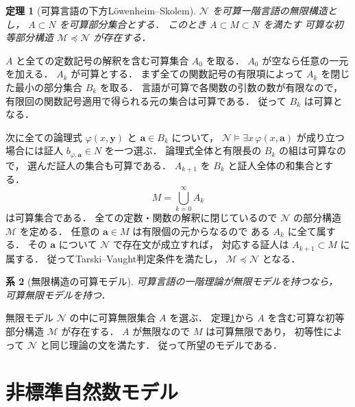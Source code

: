 \documentclass[a5paper,10pt,onecolumn]{jsarticle}
\makeatletter
\theoremstyle{mathnotetheorem}
\newtheorem{theorem}{定理}[section]
\newtheorem{corollary}[theorem]{系}
\renewcommand{\proofname}{証明}
\renewenvironment{proof}[1][\proofname]{%
  \par\pushQED{\qed}\normalfont\topsep4\p@\@plus2\p@\relax
  \trivlist\item[\hskip\labelsep\bfseries #1]\ignorespaces
}{\popQED\endtrivlist\@endpefalse}
\makeatother
\begin{document}
\begin{theorem}[可算言語の下方L\"owenheim--Skolem]
\label{thm:ls}
$\mathcal N$ を可算一階言語の無限構造とし，
$A\subset N$ を可算部分集合とする．
このとき $A\subset M\subset N$ を満たす
可算な初等部分構造 $\mathcal M\preccurlyeq\mathcal N$
が存在する．
\end{theorem}
\begin{proof}
$A$ と全ての定数記号の解釈を含む可算集合 $A_0$ を取る．
$A_0$ が空なら任意の一元を加える．
$A_k$ が可算とする．
まず全ての関数記号の有限項によって
$A_k$ を閉じた最小の部分集合 $B_k$ を取る．
言語が可算で各関数の引数の数が有限なので，
有限回の関数記号適用で得られる元の集合は可算である．
従って $B_k$ は可算となる．

次に全ての論理式 $\varphi(x,\boldsymbol y)$ と
$\boldsymbol a\in B_k$ について，
$\mathcal N\models\exists x\,\varphi(x,\boldsymbol a)$
が成り立つ場合には証人 $b_{\varphi,\boldsymbol a}\in N$
を一つ選ぶ．
論理式全体と有限長の $B_k$ の組は可算なので，
選んだ証人の集合も可算である．
$A_{k+1}$ を $B_k$ と証人全体の和集合とする．
\[
 M=\bigcup_{k=0}^\infty A_k
\]
は可算集合である．
全ての定数・関数の解釈に閉じているので
$\mathcal N$ の部分構造 $\mathcal M$ を定める．
任意の $\boldsymbol a\in M$ は有限個の元からなるので
ある $A_k$ に全て属する．
その $\boldsymbol a$ について
$\mathcal N$ で存在文が成立すれば，
対応する証人は $A_{k+1}\subset M$ に属する．
従ってTarski--Vaught判定条件を満たし，
$\mathcal M\preccurlyeq\mathcal N$ となる．
\end{proof}

\begin{corollary}[無限構造の可算モデル]\label{cor:countable-model}
可算言語の一階理論が無限モデルを持つなら，
可算無限モデルを持つ．
\end{corollary}
\begin{proof}
無限モデル $\mathcal N$ の中に可算無限集合 $A$ を選ぶ．
定理\ref{thm:ls}から $A$ を含む可算な初等部分構造
$\mathcal M$ が存在する．
$A$ が無限なので $M$ は可算無限であり，
初等性によって $\mathcal N$ と同じ理論の文を満たす．
従って所望のモデルである．
\end{proof}

\section{非標準自然数モデル}
\end{document}
